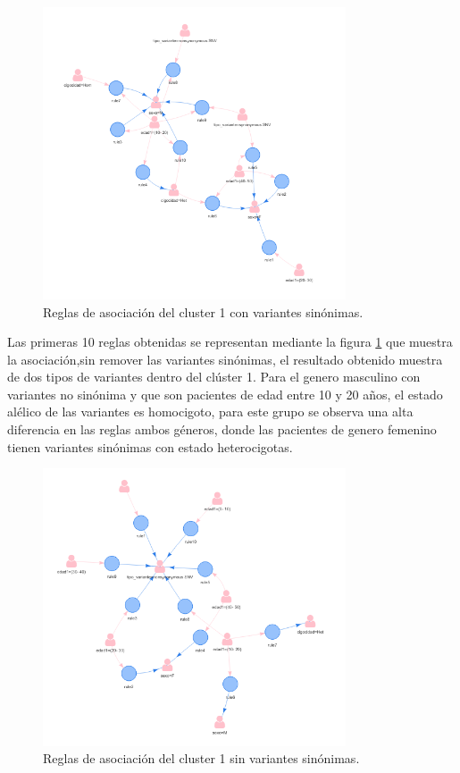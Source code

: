 \begin{figure}[H]
	\centering
	\includegraphics[width=0.8\textwidth]{Kap4/reglas1_1}
	\caption{Reglas de asociación del cluster 1 con variantes sinónimas.} \label{fig:reglas1}
\end{figure}

Las primeras 10 reglas obtenidas se representan mediante la figura \ref{fig:reglas1} que muestra la asociación,sin remover las variantes sinónimas, el resultado obtenido muestra de dos tipos de variantes dentro del clúster 1. Para el genero masculino con variantes   no sinónima y que son pacientes de edad entre 10 y 20 años, el estado alélico de las variantes es homocigoto, para este grupo se observa una alta diferencia en las reglas ambos géneros, donde las pacientes de genero femenino tienen variantes sinónimas con estado heterocigotas.

\begin{figure}[H]
	\centering
	\includegraphics[width=0.8\textwidth]{Kap4/reglas1_2}
	\caption{Reglas de asociación del cluster 1 sin variantes sinónimas.} \label{fig:reglas2}
\end{figure}


